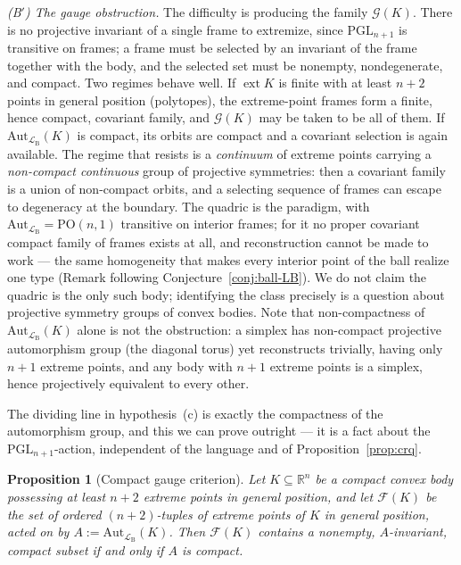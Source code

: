 \documentclass[11pt]{amsart}
\newtheorem{proposition}[theorem]{Proposition}
\theoremstyle{definition}
\newcommand{\R}{\mathbb{R}}
\newcommand{\LB}{\mathcal{L}_{\mathrm{B}}}
\newcommand{\ext}{\operatorname{ext}}
\newcommand{\PGL}{\mathrm{PGL}}
\begin{document}
\emph{(B$'$) The gauge obstruction.} The difficulty is producing the family
$\mathcal G(K)$. There is no projective invariant of a single frame to
extremize, since $\PGL_{n+1}$ is transitive on frames; a frame must be selected
by an invariant of the frame together with the body, and the selected set must
be nonempty, nondegenerate, and compact. Two regimes behave well. If
$\ext K$ is finite with at least $n+2$ points in general position (polytopes),
the extreme-point frames form a finite, hence compact, covariant family, and
$\mathcal G(K)$ may be taken to be all of them. If $\mathrm{Aut}_{\LB}(K)$ is
compact, its orbits are compact and a covariant selection is again available.
The regime that resists is a \emph{continuum} of extreme points carrying a
\emph{non-compact continuous} group of projective symmetries: then a
covariant family is a union of non-compact orbits, and a selecting sequence of
frames can escape to degeneracy at the boundary. The quadric is the paradigm,
with $\mathrm{Aut}_{\LB}=\mathrm{PO}(n,1)$ transitive on interior frames; for
it no proper covariant compact family of frames exists at all, and
reconstruction cannot be made to work --- the same homogeneity that makes every
interior point of the ball realize one type
(Remark following Conjecture~\ref{conj:ball-LB}). We do not claim the quadric
is the only such body; identifying the class precisely is a question about
projective symmetry groups of convex bodies. Note that non-compactness of
$\mathrm{Aut}_{\LB}(K)$ alone is not the obstruction: a simplex has non-compact
projective automorphism group (the diagonal torus) yet reconstructs trivially,
having only $n+1$ extreme points, and any body with $n+1$ extreme points is a
simplex, hence projectively equivalent to every other.

The dividing line in hypothesis~(c) is exactly the compactness of the
automorphism group, and this we can prove outright --- it is a fact about the
$\PGL_{n+1}$-action, independent of the language and of
Proposition~\ref{prop:crq}.

\begin{proposition}[Compact gauge criterion]
\label{prop:gauge-criterion}
Let $K\subseteq\R^n$ be a compact convex body possessing at least $n+2$
extreme points in general position, and let $\mathcal F(K)$ be the set of
ordered $(n+2)$-tuples of extreme points of $K$ in general position, acted on
by $A:=\mathrm{Aut}_{\LB}(K)$. Then $\mathcal F(K)$ contains a nonempty,
$A$-invariant, compact subset if and only if $A$ is compact.
\end{proposition}
\end{document}
